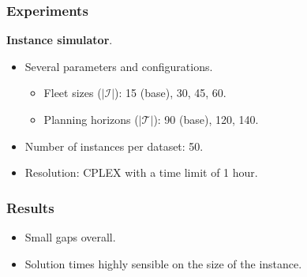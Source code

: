 \begin{frame}
\frametitle{\textbf{\firsttitleS}}
    
\end{frame}

\begin{frame}
\frametitle{\textbf{Experiments}}

  \textbf{Instance simulator}.
  \pause
  \begin{itemize}
    \item Several parameters and configurations.
    \begin{itemize}
      \item Fleet sizes ($|\mathcal{I}|$): 15 (base), 30, 45, 60.
      \item Planning horizons ($|\mathcal{T}|$): 90 (base), 120, 140.
    \end{itemize}
    \item Number of instances per dataset: 50.  
    \item Resolution: CPLEX with a time limit of 1 hour.
  \end{itemize}
\end{frame}

\begin{frame}
\frametitle{\textbf{Results}}

  \begin{itemize}[<+->]
    \item Small gaps overall.
    \item Solution times highly sensible on the size of the instance.
  \end{itemize}
  
\end{frame}

